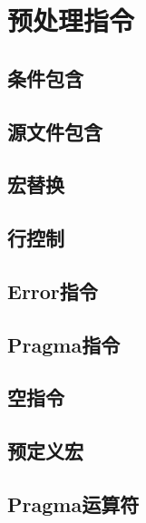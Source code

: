 \chapter{预处理指令}

\section{条件包含}
\section{源文件包含}
\section{宏替换}
\section{行控制}
\section{Error指令}
\section{Pragma指令}
\section{空指令}
\section{预定义宏}
\section{Pragma运算符}

